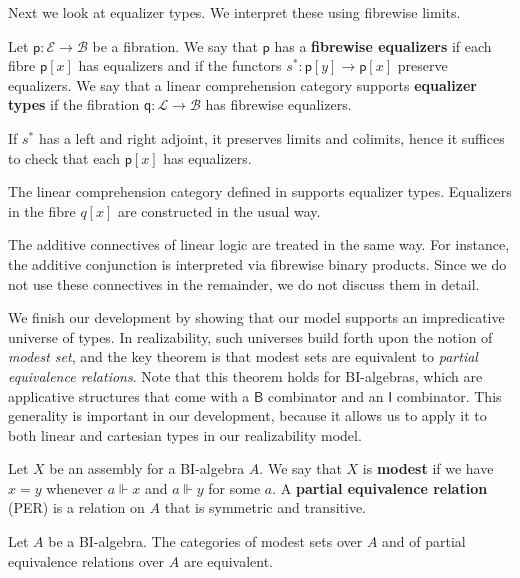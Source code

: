 \documentclass[a4paper,UKenglish,cleveref,numberwithinsect, autoref, thm-restate]{lipics-v2021}
\newcommand{\B}{\mathsf{B}}
\newcommand{\I}{\mathsf{I}}
\newcommand{\Base}{\mathcal{B}}
\newcommand{\Total}{\mathcal{E}}
\newcommand{\fib}{\mathsf{p}}
\newcommand{\subst}[1]{#1^*}
\newcommand{\fiber}[2]{#1[#2]}
\newcommand{\TotalL}{\mathcal{L}}
\newcommand{\fibM}{\mathsf{q}}
\newcommand{\LAsmPr}{q}
\newcommand{\realize}{\Vdash}
\begin{document}
Next we look at equalizer types.
We interpret these using fibrewise limits.

\begin{definition}
Let $\fib : \Total \rightarrow \Base$ be a fibration.
We say that $\fib$ has a \textbf{fibrewise equalizers}
if each fibre $\fiber{\fib}{x}$ has equalizers
and if the functors $\subst{s} : \fiber{\fib}{y} \rightarrow \fiber{\fib}{x}$ preserve equalizers.
We say that a linear comprehension category supports \textbf{equalizer types}
if the fibration $\fibM : \TotalL \rightarrow \Base$ has fibrewise equalizers.
\end{definition}

If $\subst{s}$ has a left and right adjoint, it preserves limits and colimits, hence it suffices to check that each $\fiber{\fib}{x}$ has equalizers.
\begin{example}
\label{exa:linear-realizability-equalizers}
The linear comprehension category defined in  supports equalizer types.
Equalizers in the fibre $\fiber{\LAsmPr}{x}$ are constructed in the usual way.
\end{example}

The additive connectives of linear logic are treated in the same way.
For instance, the additive conjunction is interpreted via fibrewise binary products.
Since we do not use these connectives in the remainder,
we do not discuss them in detail.

We finish our development by showing that our model supports an impredicative universe of types.
In realizability,
such universes build forth upon the notion of \emph{modest set},
and the key theorem is that modest sets are equivalent to \emph{partial equivalence relations}.
Note that this theorem holds for BI-algebras,
which are applicative structures that come with a $\B$ combinator and an $\I$ combinator.
This generality is important in our development,
because it allows us to apply it to both linear and cartesian types in our realizability model.

\begin{definition}
\label{def:modest-set}
Let $X$ be an assembly for a BI-algebra $A$.
We say that $X$ is \textbf{modest}
if we have $x = y$ whenever $a \realize x$ and $a \realize y$ for some $a$.
A \textbf{partial equivalence relation} (PER) is a relation on $A$ that is symmetric and transitive.
\end{definition}

\begin{theorem}
\label{thm:modest-set-equiv}
Let $A$ be a BI-algebra.
The categories of modest sets over $A$ and of partial equivalence relations over $A$ are equivalent.
\end{theorem}
\end{document}
